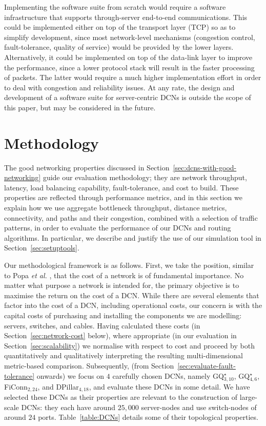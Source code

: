 \documentclass[]{amsart}
\begin{document}
Implementing the software suite from scratch would require a software
infrastructure that supports through-server end-to-end communications.
This could be implemented either on top of the transport layer (TCP)
so as to simplify development, since most network-level mechanisms
(congestion control, fault-tolerance, quality of service) would be
provided by the lower layers. Alternatively, it could be implemented
on top of the data-link layer to improve the performance, since a
lower protocol stack will result in the faster processing of packets.  The
latter would require a much higher implementation effort in order to
deal with congestion and reliability issues. At any rate, the design
and development of a software suite for server-centric DCNs is outside
the scope of this paper, but may be considered in the future.










\section{Methodology}
\label{sec:setup}

The good networking properties discussed in Section~\ref{sec:dcns-with-good-networking} guide our evaluation methodology; they are network throughput, latency, load balancing capability, fault-tolerance, and cost to build.  These properties are reflected through performance metrics, and in this section we explain how we use aggregate bottleneck throughput, distance metrics, connectivity, and paths and their congestion, combined with a selection of traffic patterns, in order to evaluate the performance of our DCNs and routing algorithms. In particular, we describe and justify the use of our simulation tool in Section~\ref{sec:setuptools}.

Our methodological framework is as follows. First, we take the position, similar to Popa \emph{et al.}
\cite{PopaRatnasamyIannaccone2010}, that the cost of a network is of fundamental importance.  No matter what purpose a network is intended for, the primary objective is to maximise the return on the cost of a DCN. While there are several elements that factor into the cost of a DCN, including operational costs, our concern is with the capital costs of purchasing and installing the components we are modelling: servers, switches, and cables. Having calculated these costs (in Section~\ref{sec:network-cost} below), where appropriate (in our evaluation in Section~\ref{sec:scalability}) we normalise with respect to cost and proceed by both quantitatively and qualitatively interpreting the resulting multi-dimensional metric-based comparison.  Subsequently, (from Section~\ref{sec:evaluate-fault-tolerance} onwards) we focus on $4$ carefully chosen DCNs, namely GQ$^\star_{3,10}$, GQ$^\star_{4,6}$, FiConn$_{2,24}$, and DPillar$_{4,18}$, and evaluate these DCNs in some detail. We have selected these DCNs as their properties are relevant to the construction of large-scale DCNs: they each have around $25,000$ server-nodes and use switch-nodes of around $24$ ports.  Table~\ref{table:DCNs} details some of their topological properties.
\end{document}
